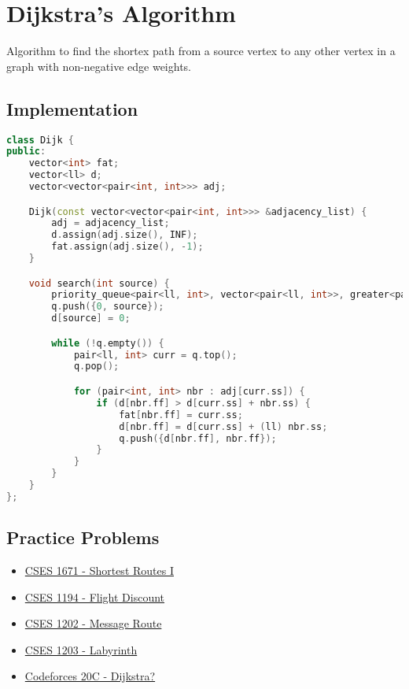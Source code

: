 \documentclass[12pt]{article}
\begin{document}
\section{Dijkstra's Algorithm}

Algorithm to find the shortex path from a source vertex to any other vertex in a graph with non-negative edge weights.

\subsection{Implementation}
\begin{lstlisting}[language=C++]
class Dijk {
public:
    vector<int> fat;
    vector<ll> d;
    vector<vector<pair<int, int>>> adj;

    Dijk(const vector<vector<pair<int, int>>> &adjacency_list) {
        adj = adjacency_list;
        d.assign(adj.size(), INF);
        fat.assign(adj.size(), -1);
    }

    void search(int source) {
        priority_queue<pair<ll, int>, vector<pair<ll, int>>, greater<pair<ll, int>>> q;
        q.push({0, source});
        d[source] = 0;

        while (!q.empty()) {
            pair<ll, int> curr = q.top();
            q.pop();

            for (pair<int, int> nbr : adj[curr.ss]) {
                if (d[nbr.ff] > d[curr.ss] + nbr.ss) {
                    fat[nbr.ff] = curr.ss;
                    d[nbr.ff] = d[curr.ss] + (ll) nbr.ss;
                    q.push({d[nbr.ff], nbr.ff});
                }
            }
        }
    }
};
\end{lstlisting}

\subsection{Practice Problems}
\begin{itemize}
    \item \href{https://cses.fi/problemset/task/1671}{CSES 1671 - Shortest Routes I}
    \item \href{https://cses.fi/problemset/task/1194}{CSES 1194 - Flight Discount}
    \item \href{https://cses.fi/problemset/task/1202}{CSES 1202 - Message Route}
    \item \href{https://cses.fi/problemset/task/1203}{CSES 1203 - Labyrinth}
    \item \href{https://codeforces.com/problemset/problem/20/C}{Codeforces 20C - Dijkstra?}
\end{itemize}
\end{document}
